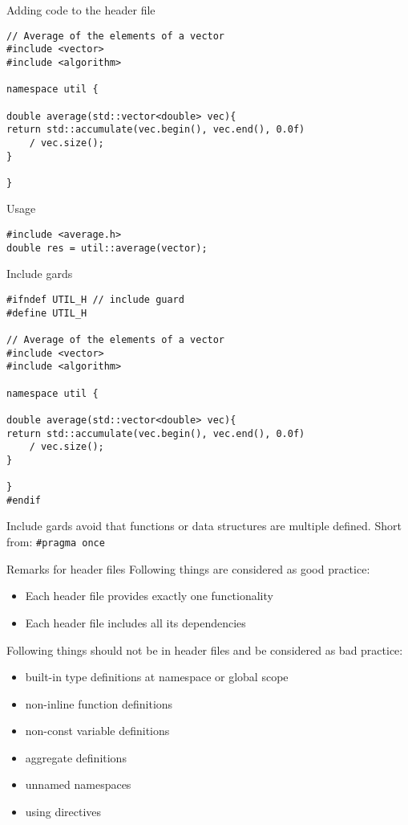 \documentclass[12pt,t]{beamer}
\begin{document}
\begin{frame}[fragile]{Adding code to the header file}
\begin{lstlisting}
// Average of the elements of a vector
#include <vector>
#include <algorithm>

namespace util {

double average(std::vector<double> vec){
return std::accumulate(vec.begin(), vec.end(), 0.0f) 
	/ vec.size();
}

}
\end{lstlisting}
\begin{block}{Usage}
\begin{lstlisting}
#include <average.h>
double res = util::average(vector);
\end{lstlisting}
\end{block}
\end{frame}


\begin{frame}[fragile]{Include gards}
\begin{lstlisting}
#ifndef UTIL_H // include guard
#define UTIL_H

// Average of the elements of a vector
#include <vector>
#include <algorithm>

namespace util {

double average(std::vector<double> vec){
return std::accumulate(vec.begin(), vec.end(), 0.0f) 
	/ vec.size();
}

}
#endif
\end{lstlisting}
Include gards avoid that functions or data structures are multiple defined. Short from: \lstinline|#pragma once|
\end{frame}

\begin{frame}{Remarks for header files}
Following things are considered as good practice:
\begin{itemize}
\item Each header file provides exactly one functionality 
\item Each header file includes all its dependencies
\end{itemize}
\vspace{0.25cm}
Following things should not be in header files and be considered as bad practice:
\begin{itemize}
\item built-in type definitions at namespace or global scope
\item non-inline function definitions
\item non-const variable definitions
\item aggregate definitions
\item unnamed namespaces
\item using directives
\end{itemize}

\end{frame}
\end{document}
